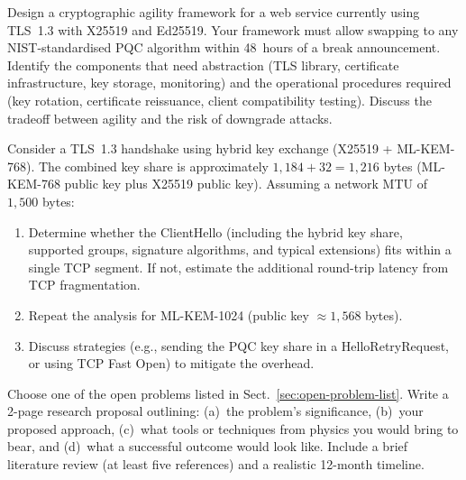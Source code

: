 \begin{prob}
\label{prob:ch15-agility}
Design a cryptographic agility framework for a web service currently using TLS~1.3 with X25519 and Ed25519.  Your framework must allow swapping to any NIST-standardised PQC algorithm within 48~hours of a break announcement.  Identify the components that need abstraction (TLS library, certificate infrastructure, key storage, monitoring) and the operational procedures required (key rotation, certificate reissuance, client compatibility testing).  Discuss the tradeoff between agility and the risk of downgrade attacks.
\end{prob}

\begin{prob}
\label{prob:ch15-hybrid-overhead}
Consider a TLS~1.3 handshake using hybrid key exchange (X25519 + ML-KEM-768).  The combined key share is approximately $1{,}184 + 32 = 1{,}216$ bytes (ML-KEM-768 public key plus X25519 public key).  Assuming a network MTU of $1{,}500$ bytes:
\begin{enumerate}
\item[(a)] Determine whether the ClientHello (including the hybrid key share, supported groups, signature algorithms, and typical extensions) fits within a single TCP segment.  If not, estimate the additional round-trip latency from TCP fragmentation.
\item[(b)] Repeat the analysis for ML-KEM-1024 (public key $\approx 1{,}568$ bytes).
\item[(c)] Discuss strategies (e.g., sending the PQC key share in a HelloRetryRequest, or using TCP Fast Open) to mitigate the overhead.
\end{enumerate}
\end{prob}

\begin{prob}
\label{prob:ch15-research}
Choose one of the open problems listed in Sect.~\ref{sec:open-problem-list}.  Write a 2-page research proposal outlining: (a)~the problem's significance, (b)~your proposed approach, (c)~what tools or techniques from physics you would bring to bear, and (d)~what a successful outcome would look like.  Include a brief literature review (at least five references) and a realistic 12-month timeline.
\end{prob}
